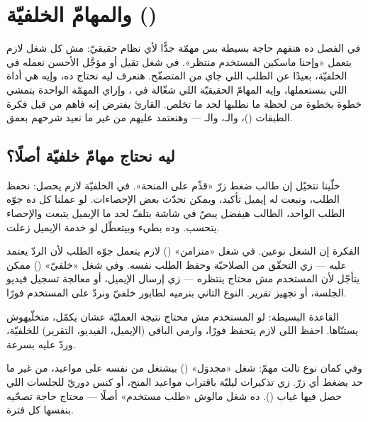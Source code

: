 \section{ والمهامّ الخلفيّة ()}

في الفصل ده هنفهم حاجة بسيطة بس مهمّة جدًّا لأي نظام حقيقيّ: مش كل شغل لازم يتعمل
«وإحنا ماسكين المستخدم منتظر». في شغل تقيل أو مؤجَّل الأحسن نعمله في الخلفيّة، بعيدًا عن
الطلب اللي جاي من المتصفّح. هنعرف ليه نحتاج ده، وإيه هي أداة  اللي بنستعملها،
وإيه المهامّ الحقيقيّة اللي شغّالة في ، وإزاي المهمّة الواحدة بتمشي خطوة
بخطوة من لحظة ما نطلبها لحد ما تخلص. القارئ يفترض إنه فاهم من قبل فكرة الطبقات
()، والـ، والـ — وهنعتمد عليهم من غير ما نعيد شرحهم
بعمق.

\subsection{ليه نحتاج مهامّ خلفيّة أصلًا؟}

خلّينا نتخيّل إن طالب ضغط زرّ «قدِّم على المنحة». في الخلفيّة لازم يحصل: نحفظ الطلب،
ونبعت له إيميل تأكيد، ويمكن نحدّث بعض الإحصاءات. لو عملنا كل ده جوّه الطلب الواحد،
الطالب هيفضل يبصّ في شاشة بتلفّ لحد ما الإيميل يتبعت والإحصاء يتحسب. وده بطيء وبيتعطّل
لو خدمة الإيميل زعلت.

الفكرة إن الشغل نوعين. في شغل «متزامن» () لازم يتعمل جوّه الطلب لأن الردّ
يعتمد عليه — زي التحقّق من الصلاحيّة وحفظ الطلب نفسه. وفي شغل «خلفيّ» ()
ممكن يتأجّل لأن المستخدم مش محتاج ينتظره — زي إرسال الإيميل، أو معالجة تسجيل فيديو
الجلسة، أو تجهيز تقرير. النوع التاني بنرميه لطابور خلفيّ ونردّ على المستخدم فورًا.

\begin{idea}
القاعدة البسيطة: لو المستخدم مش محتاج نتيجة العمليّة عشان يكمّل، متخلّيهوش يستنّاها.
احفظ اللي لازم يتحفظ فورًا، وارمي الباقي (الإيميل، الفيديو، التقرير) للخلفيّة، وردّ عليه
بسرعة.
\end{idea}

وفي كمان نوع تالت مهمّ: شغل «مجدوَل» () بيشتغل من نفسه على مواعيد، من غير
ما حد يضغط أي زرّ. زي تذكيرات ليليّة باقتراب مواعيد المنح، أو كنس دوريّ للجلسات اللي حصل
فيها غياب (). ده شغل مالوش «طلب مستخدم» أصلًا — محتاج حاجة تصحّيه بنفسها كل
فترة.

